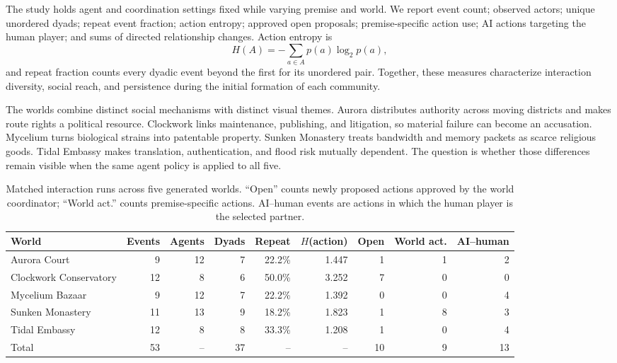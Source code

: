 \documentclass[10pt,twocolumn]{article}
\begin{document}
The study holds agent and coordination settings fixed while varying premise and
world. We report event count; observed actors; unique unordered dyads; repeat
event fraction; action entropy; approved open proposals; premise-specific
action use; AI actions targeting the human player; and sums of directed
relationship changes. Action entropy is
\[
H(A)=-\sum_{a\in A}p(a)\log_2 p(a),
\]
and repeat fraction counts every dyadic event beyond the first for its unordered
pair. Together, these measures characterize interaction diversity, social
reach, and persistence during the initial formation of each community.

The worlds combine distinct social mechanisms with distinct visual themes.
Aurora distributes authority across moving districts
and makes route rights a political resource. Clockwork links maintenance,
publishing, and litigation, so material failure can become an accusation.
Mycelium turns biological strains into patentable property. Sunken Monastery
treats bandwidth and memory packets as scarce religious goods. Tidal Embassy
makes translation, authentication, and flood risk mutually dependent. The
question is whether those differences remain visible when the same agent policy
is applied to all five.

\begin{table}[t]
\centering
\small
\begin{tabular}{lrrrrrrrr}
\toprule
World & Events & Agents & Dyads & Repeat & $H$(action) & Open & World act. & AI--human \\
\midrule
Aurora Court & 9 & 12 & 7 & 22.2\% & 1.447 & 1 & 1 & 2 \\
Clockwork Conservatory & 12 & 8 & 6 & 50.0\% & 3.252 & 7 & 0 & 0 \\
Mycelium Bazaar & 9 & 12 & 7 & 22.2\% & 1.392 & 0 & 0 & 4 \\
Sunken Monastery & 11 & 13 & 9 & 18.2\% & 1.823 & 1 & 8 & 3 \\
Tidal Embassy & 12 & 8 & 8 & 33.3\% & 1.208 & 1 & 0 & 4 \\
\midrule
Total & 53 & -- & 37 & -- & -- & 10 & 9 & 13 \\
\bottomrule
\end{tabular}
\caption{Matched interaction runs across five generated worlds. ``Open''
counts newly proposed actions approved by the world coordinator; ``World
act.'' counts premise-specific actions. AI--human events are actions in which
the human player is the selected partner.}
\label{tab:multiworld}
\end{table}
\end{document}
